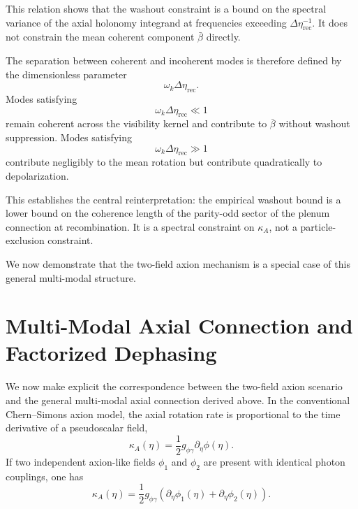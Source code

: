 \documentclass[12pt]{article}
\begin{document}
This relation shows that the washout constraint is a bound on the spectral variance of the axial holonomy integrand at frequencies exceeding $\Delta\eta_{\mathrm{rec}}^{-1}$. It does not constrain the mean coherent component $\bar{\beta}$ directly.

The separation between coherent and incoherent modes is therefore defined by the dimensionless parameter
\begin{equation}
\omega_k \Delta\eta_{\mathrm{rec}}.
\end{equation}
Modes satisfying
\begin{equation}
\omega_k \Delta\eta_{\mathrm{rec}} \ll 1
\end{equation}
remain coherent across the visibility kernel and contribute to $\bar{\beta}$ without washout suppression. Modes satisfying
\begin{equation}
\omega_k \Delta\eta_{\mathrm{rec}} \gg 1
\end{equation}
contribute negligibly to the mean rotation but contribute quadratically to depolarization.

This establishes the central reinterpretation: the empirical washout bound is a lower bound on the coherence length of the parity-odd sector of the plenum connection at recombination. It is a spectral constraint on $\kappa_A$, not a particle-exclusion constraint.

We now demonstrate that the two-field axion mechanism is a special case of this general multi-modal structure.

\newpage
\section{Multi-Modal Axial Connection and Factorized Dephasing}

We now make explicit the correspondence between the two-field axion scenario and the general multi-modal axial connection derived above. In the conventional Chern--Simons axion model, the axial rotation rate is proportional to the time derivative of a pseudoscalar field,
\begin{equation}
\kappa_A(\eta)
=
\frac{1}{2} g_{\phi\gamma} \partial_\eta \phi(\eta).
\end{equation}
If two independent axion-like fields $\phi_1$ and $\phi_2$ are present with identical photon couplings, one has
\begin{equation}
\kappa_A(\eta)
=
\frac{1}{2} g_{\phi\gamma}
\left(
\partial_\eta \phi_1(\eta)
+
\partial_\eta \phi_2(\eta)
\right).
\end{equation}
\end{document}
